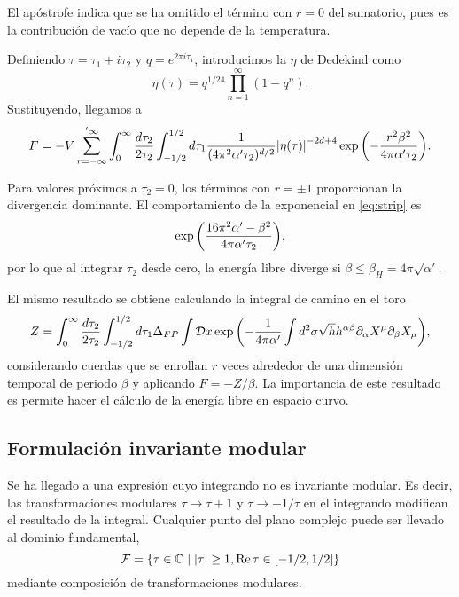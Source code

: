 El apóstrofe indica que se ha omitido el término con $r=0$ del sumatorio, pues es la contribución
de vacío que no depende de la temperatura.

Definiendo $\tau=\tau_1+i\tau_2$ y $q=e^{2\pi i\tau_1}$, introducimos la $\eta$ de 
Dedekind como
\begin{equation}
  \eta(\tau)=q^{1/24}\prod_{n=1}^{\infty} (1-q^n).
\end{equation}
Sustituyendo, llegamos a 
\begin{equation}
  F=-V \sum_{r=-\infty}^{'\infty} \int_0^\infty\frac{d\tau_2}{2\tau_2} \int_{-1/2}^{1/2} d\tau_1  \frac{1}{(4\pi^2\alpha'\tau_2)^{d/2}}
  \abs{\eta(\tau)}^{-2d+4}\exp\qty(-\frac{r^2\beta^2}{4\pi\alpha'\tau_2}).
  \label{eq:strip}
\end{equation}

Para valores próximos a $\tau_2=0$, los términos con $r=\pm 1$ proporcionan la divergencia 
dominante.
El comportamiento de la exponencial en \ref{eq:strip} es
\begin{equation}
  \exp\qty(\frac{16\pi^2 \alpha' -\beta^2}{4\pi\alpha'\tau_2}),
\end{equation}
por lo que al integrar $\tau_2$ desde cero, la energía libre diverge si $\beta\leq \beta_H=4\pi\sqrt{\alpha'}$.

El mismo resultado se obtiene calculando la integral de camino en el toro
\begin{equation}
  Z= \int_0^\infty\frac{d\tau_2}{2\tau_2} \int_{-1/2}^{1/2} d\tau_1 \Delta_{FP} \int \mathcal Dx
  \exp\qty(-\frac{1}{4\pi\alpha'}\int d^2\sigma \sqrt h h^{\alpha\beta}\partial_\alpha X^\mu \partial_\beta X_\mu),
\end{equation}
considerando cuerdas que se enrollan $r$ veces alrededor de una dimensión temporal de periodo $\beta$
y aplicando $F=-Z/\beta$.
La importancia de este resultado es permite hacer el cálculo de la energía libre en espacio curvo.

\subsection{Formulación invariante modular}
\label{sec:taq}
Se ha llegado a una expresión cuyo integrando no es invariante modular. Es decir, las
transformaciones modulares $\tau\to\tau+1$ y $\tau\to-1/\tau$ en el integrando modifican el resultado
de la integral.
Cualquier punto del plano complejo puede ser llevado al dominio fundamental,
\begin{equation}
  \mathcal F = \qty{ \tau \in \mathbb{C} \mid \abs{\tau} \geq 1, \Re\tau \in [-1/2,1/2]}
\end{equation}
mediante composición de transformaciones modulares.

